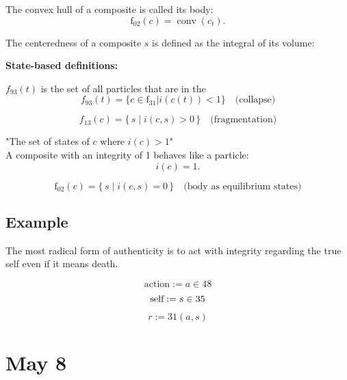 \documentclass[12pt]{article}
\begin{document}
The convex hull of a composite is called its body:
\[
\text{f}_{02}(c) = \operatorname{conv}(c_t).
\]

The centeredness of a composite $s$ is defined as the integral of its volume:

\bigskip

\textbf{State-based definitions:}

$f_{93}(t)$ is the set of all particles that are in the  
\[
f_{93}(t) = \{c\in \text{f}_{31} |i(c(t)) < 1\} \quad \text{(collapse)}
\]

\[
f_{13}(c) = \{\, s \mid i(c,s) > 0 \,\} \quad \text{(fragmentation)}
\]

"The set of states of $c$ where $i(c) > 1$"\\

A composite with an integrity of 1 behaves like a particle:
\[
i(c) = 1.
\]

\[
\text{f}_{02}(c) = \{\, s \mid i(c,s) = 0 \,\} \quad \text{(body as equilibrium states)}
\]

\subsection{Example}

The most radical form of authenticity is to act with integrity regarding the true self even if it means death.

\[
\text{action} := a \in 48
\]
\[
\text{self} := s \in 35\\
\]
\[
r := 31(a, s) 
\]

\section{May 8}

\subsection{}
\end{document}
